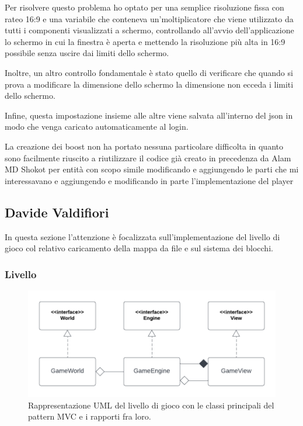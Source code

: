 \documentclass[a4paper,12pt]{report}
\begin{document}
Per risolvere questo problema ho optato per una semplice risoluzione fissa con rateo 16:9 e una variabile che conteneva un’moltiplicatore che viene utilizzato da tutti i componenti visualizzati a schermo, controllando all’avvio dell’applicazione lo schermo in cui la finestra è aperta e mettendo la risoluzione più alta in 16:9 possibile senza uscire dai limiti dello schermo. 

Inoltre, un altro controllo fondamentale è stato quello di verificare che quando si prova a modificare la dimensione dello schermo la dimensione non ecceda i limiti dello schermo. 

Infine, questa impostazione insieme alle altre viene salvata all’interno del json in modo che venga caricato automaticamente al login. 

La creazione dei boost non ha portato nessuna particolare difficolta in quanto sono facilmente riuscito a riutilizzare il codice già creato in precedenza da Alam MD Shokot per entità con scopo simile modificando e aggiungendo le parti che mi interessavano e aggiungendo e modificando in parte l’implementazione del player 

\subsection*{Davide Valdifiori}

In questa sezione l'attenzione è focalizzata sull'implementazione del livello di gioco col relativo caricamento della mappa da file e sul sistema  dei blocchi.

\subsubsection{Livello}

\begin{figure}[H]
\centering{}
\includegraphics[scale=1] {img/livello-mvc.png}
\caption{Rappresentazione UML del livello di gioco con le classi principali del pattern MVC e i rapporti fra loro.}
\label{img:livello-mvc}
\end{figure}
\end{document}
